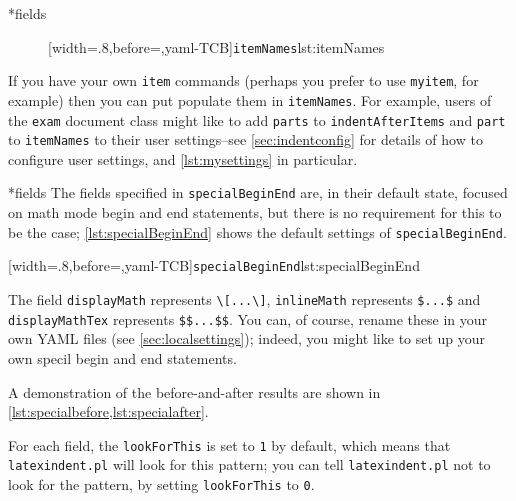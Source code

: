 \documentclass[10pt]{article}
\begin{document}
*{fields} 
\begin{figure}
[width=.8\linewidth,before=\centering,yaml-TCB]{\texttt{itemNames}}{lst:itemNames}
\end{figure}
If you have your own \texttt{item} commands (perhaps you
prefer to use \texttt{myitem}, for example)
then you can put populate them in \texttt{itemNames}.
For example, users of the \texttt{exam} document class might like to add
\texttt{parts} to \texttt{indentAfterItems} and \texttt{part} to \texttt{itemNames}
to their user settings--see \vref{sec:indentconfig} for details of how to configure user settings,
and \vref{lst:mysettings} in particular.\label{page:examsettings}

*{fields}
The fields specified in \texttt{specialBeginEnd} are, in their default state, focused on math mode begin and end statements, but 
there is no requirement for this to be the case; \cref{lst:specialBeginEnd} shows the 
default settings of \texttt{specialBeginEnd}.

[width=.8\linewidth,before=\centering,yaml-TCB]{\texttt{specialBeginEnd}}{lst:specialBeginEnd}

    The field \texttt{displayMath} represents \lstinline!\[...\]!, \texttt{inlineMath} represents
    \lstinline!$...$! and \texttt{displayMathTex} represents \lstinline!$$...$$!. You can, of course, 
    rename these in your own YAML files (see \vref{sec:localsettings}); indeed, you 
    might like to set up your own specil begin and end statements.

    A demonstration of the before-and-after results are shown in \cref{lst:specialbefore,lst:specialafter}.

\begin{minipage}{.45\textwidth}
\end{minipage}%
\hfill
\begin{minipage}{.45\textwidth}
\end{minipage}

For each field, the \texttt{lookForThis} is set to \texttt{1} by default, which means that \texttt{latexindent.pl}
will look for this pattern; you can tell \texttt{latexindent.pl} not to look for the pattern, by setting 
\texttt{lookForThis} to \texttt{0}. 
\end{document}
